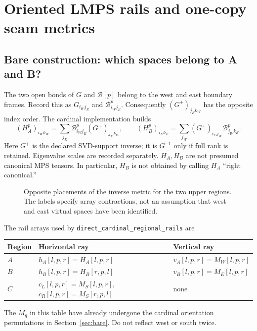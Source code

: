 \documentclass[11pt]{article}
\newcommand{\code}[1]{{\small\nolinkurl{#1}}}
\begin{document}
\section{Oriented LMPS rails and one-copy seam metrics}
\ifdetailed
\subsection{Bare construction: which spaces belong to A and B?}
The two open bonds of $G$ and $\mathcal B[p]$ belong to the west and east
boundary frames. Record this as $G_{i_Wj_E}$ and $\mathcal B^p_{i_Wj_E}$.
Consequently $(G^+)_{j_Ek_W}$ has the opposite index order. The cardinal
implementation builds
\begin{equation}\label{eq:bare-ab}
 (H_A^p)_{i_Wk_W}=\sum_{j_E}\mathcal B^p_{i_Wj_E}(G^+)_{j_Ek_W},\qquad
 (H_B^p)_{i_Ek_E}=\sum_{j_W}(G^+)_{i_Ej_W}\mathcal B^p_{j_Wk_E}.
\end{equation}
Here $G^+$ is the declared SVD-support inverse; it is $G^{-1}$ only if full
rank is retained. Eigenvalue scales are recorded separately. $H_A,H_B$ are
not presumed canonical MPS tensors. In particular, $H_B$ is not obtained by
calling $H_A$ ``right canonical.''

\begin{figure}[htbp]\centering
{}
\caption{Opposite placements of the inverse metric for the two upper regions.
The labels specify array contractions, not an assumption that west and east
virtual spaces have been identified.}
\end{figure}

The rail arrays used by \code{direct_cardinal_regional_rails} are
\begin{center}\small
\begin{tabular}{lll}\toprule
Region & Horizontal ray & Vertical ray\\\midrule
$A$ & $h_A[l,p,r]=H_A[l,p,r]$ & $v_A[l,p,r]=M_W[l,p,r]$\\
$B$ & $h_B[l,p,r]=H_B[r,p,l]$ & $v_B[l,p,r]=M_E[l,p,r]$\\
$C$ & $c_L[l,p,r]=M_S[l,p,r]$, $c_R[l,p,r]=M_S[r,p,l]$ & none\\\bottomrule
\end{tabular}
\end{center}
The $M_q$ in this table have already undergone the cardinal orientation
permutations in Section~\ref{sec:bare}. Do not reflect west or south twice.
\end{document}
